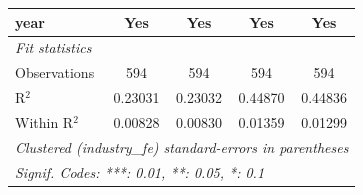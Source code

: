 \begin{tabular}{lcccc}
   year                                         & Yes      & Yes      & Yes           & Yes\\  
   \midrule
   \emph{Fit statistics}\\
   Observations                                 & 594      & 594      & 594           & 594\\  
   R$^2$                                        & 0.23031  & 0.23032  & 0.44870       & 0.44836\\  
   Within R$^2$                                 & 0.00828  & 0.00830  & 0.01359       & 0.01299\\  
   \midrule \midrule
   \multicolumn{5}{l}{\emph{Clustered (industry\_fe) standard-errors in parentheses}}\\
   \multicolumn{5}{l}{\emph{Signif. Codes: ***: 0.01, **: 0.05, *: 0.1}}\\
\end{tabular}
\par\endgroup
